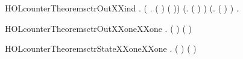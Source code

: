 \newcommand{\HOLcounterTheoremsctrOutXXdef}{\UseVerbatim{HOLcounterTheoremsctrOutXXdef}}
\begin{SaveVerbatim}{HOLcounterTheoremsctrOutXXind}
\HOLTokenTurnstile{} \HOLSymConst{\HOLTokenForall{}}.
     (\HOLSymConst{\HOLTokenForall{}} .  ( ) ( )) \HOLSymConst{\HOLTokenConj{}} (\HOLSymConst{\HOLTokenForall{}}.  ( ) ) \HOLSymConst{\HOLTokenConj{}}
     (\HOLSymConst{\HOLTokenForall{}}.  ( ) ) \HOLSymConst{\HOLTokenImp{}}
     \HOLSymConst{\HOLTokenForall{}} .   
\end{SaveVerbatim}
\newcommand{\HOLcounterTheoremsctrOutXXind}{\UseVerbatim{HOLcounterTheoremsctrOutXXind}}
\begin{SaveVerbatim}{HOLcounterTheoremsctrOutXXoneXXone}
\HOLTokenTurnstile{} \HOLSymConst{\HOLTokenForall{}} . (  \HOLSymConst{=}  ) \HOLSymConst{\HOLTokenEquiv{}} ( \HOLSymConst{=} )
\end{SaveVerbatim}
\newcommand{\HOLcounterTheoremsctrOutXXoneXXone}{\UseVerbatim{HOLcounterTheoremsctrOutXXoneXXone}}
\begin{SaveVerbatim}{HOLcounterTheoremsctrStateXXoneXXone}
\HOLTokenTurnstile{} \HOLSymConst{\HOLTokenForall{}} . (  \HOLSymConst{=}  ) \HOLSymConst{\HOLTokenEquiv{}} ( \HOLSymConst{=} )
\end{SaveVerbatim}
\newcommand{\HOLcounterTheoremsctrStateXXoneXXone}{\UseVerbatim{HOLcounterTheoremsctrStateXXoneXXone}}
